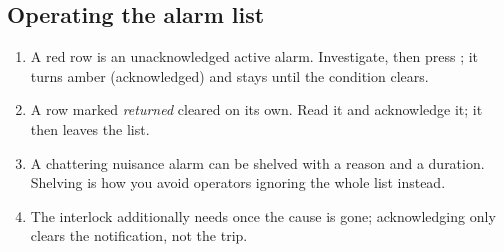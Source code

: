 \subsection{Operating the alarm list}
\begin{enumerate}
  \item A red row is an unacknowledged active alarm. Investigate, then press
        ; it turns amber (acknowledged) and stays until the condition
        clears.
  \item A row marked \emph{returned} cleared on its own. Read it and
        acknowledge it; it then leaves the list.
  \item A chattering nuisance alarm can be shelved with a reason and a
        duration. Shelving is how you avoid operators ignoring the whole
        list instead.
  \item The interlock additionally needs  once the cause is gone;
        acknowledging only clears the notification, not the trip.
\end{enumerate}

